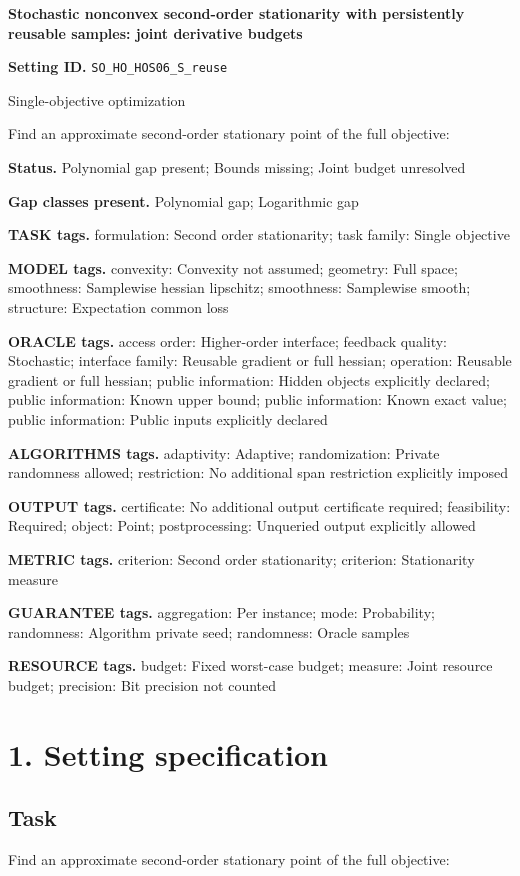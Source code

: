 \documentclass[10pt,a4paper]{article}
\begin{document}
\raggedright

{\LARGE\bfseries\sffamily\color{AtlasNavy} Stochastic nonconvex second-order stationarity with persistently reusable samples: joint derivative budgets\par}\vspace{5pt}
\textbf{Setting ID.} \texttt{SO\_\allowbreak{}\allowbreak{}HO\_\allowbreak{}\allowbreak{}HOS06\_\allowbreak{}\allowbreak{}S\_\allowbreak{}\allowbreak{}reuse}

Single-objective optimization

Find an approximate second-order stationary point of the full objective:

\textbf{Status.} Polynomial gap present; Bounds missing; Joint budget unresolved

\textbf{Gap classes present.} Polynomial gap; Logarithmic gap

\textbf{TASK tags.} formulation: Second order stationarity; task family: Single objective

\textbf{MODEL tags.} convexity: Convexity not assumed; geometry: Full space; smoothness: Samplewise hessian lipschitz; smoothness: Samplewise smooth; structure: Expectation common loss

\textbf{ORACLE tags.} access order: Higher-order interface; feedback quality: Stochastic; interface family: Reusable gradient or full hessian; operation: Reusable gradient or full hessian; public information: Hidden objects explicitly declared; public information: Known upper bound; public information: Known exact value; public information: Public inputs explicitly declared

\textbf{ALGORITHMS tags.} adaptivity: Adaptive; randomization: Private randomness allowed; restriction: No additional span restriction explicitly imposed

\textbf{OUTPUT tags.} certificate: No additional output certificate required; feasibility: Required; object: Point; postprocessing: Unqueried output explicitly allowed

\textbf{METRIC tags.} criterion: Second order stationarity; criterion: Stationarity measure

\textbf{GUARANTEE tags.} aggregation: Per instance; mode: Probability; randomness: Algorithm private seed; randomness: Oracle samples

\textbf{RESOURCE tags.} budget: Fixed worst-case budget; measure: Joint resource budget; precision: Bit precision not counted

\section{1. Setting specification}
\subsection{Task}
Find an approximate second-order stationary point of the full objective:
\end{document}
